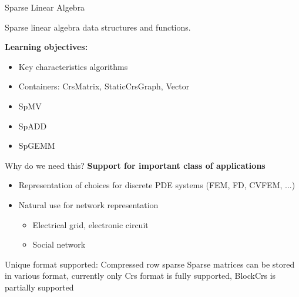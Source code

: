 \begin{frame}[fragile]

  {\Huge Sparse Linear Algebra}

  \vspace{10pt}

  {\large Sparse linear algebra data structures and functions.}

  \vspace{20pt}

  \textbf{Learning objectives:}
  \begin{itemize}
    \item {Key characteristics algorithms}
    \item {Containers: CrsMatrix, StaticCrsGraph, Vector}
    \item {SpMV}
    \item {SpADD}
    \item {SpGEMM}
  \end{itemize}

  \vspace{-20pt}

\end{frame}


\begin{frame}[fragile]{Why do we need this?}
  \textbf{Support for important class of applications}

  \begin{itemize}
  \item Representation of choices for discrete PDE systems (FEM, FD, CVFEM, ...)
  \item Natural use for network representation
    \begin{itemize}
    \item Electrical grid, electronic circuit
    \item Social network
    \end{itemize}
  \end{itemize}


  \begin{block}{Unique format supported: Compressed row sparse}
    Sparse matrices can be stored in various format, currently only Crs format is fully supported, BlockCrs is partially supported
  \end{block}
\end{frame}

